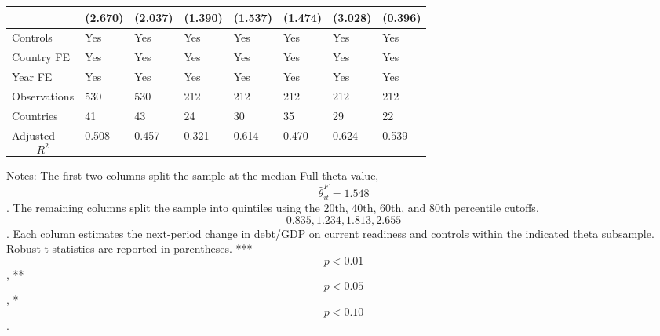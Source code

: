 \begin{table}[H]
\begin{threeparttable}
\begin{tabularx}{\textwidth}{lYYYYYYY}
  & (2.670) & (2.037) & (1.390) & (1.537) & (1.474) & (3.028) & (0.396) \\
\midrule
Controls & Yes & Yes & Yes & Yes & Yes & Yes & Yes \\
Country FE & Yes & Yes & Yes & Yes & Yes & Yes & Yes \\
Year FE & Yes & Yes & Yes & Yes & Yes & Yes & Yes \\
Observations & 530 & 530 & 212 & 212 & 212 & 212 & 212 \\
Countries & 41 & 43 & 24 & 30 & 35 & 29 & 22 \\
Adjusted $$R^2$$ & 0.508 & 0.457 & 0.321 & 0.614 & 0.470 & 0.624 & 0.539 \\
\bottomrule
\end{tabularx}
\begin{tablenotes}[flushleft]\footnotesize
\item Notes: The first two columns split the sample at the median Full-theta value, $$\widehat{\theta}^{F}_{it}=1.548$$. The remaining columns split the sample into quintiles using the 20th, 40th, 60th, and 80th percentile cutoffs, $$0.835, 1.234, 1.813, 2.655$$. Each column estimates the next-period change in debt/GDP on current readiness and controls within the indicated theta subsample. Robust t-statistics are reported in parentheses. *** $$p<0.01$$, ** $$p<0.05$$, * $$p<0.10$$.
\end{tablenotes}
\end{threeparttable}
\end{table}
